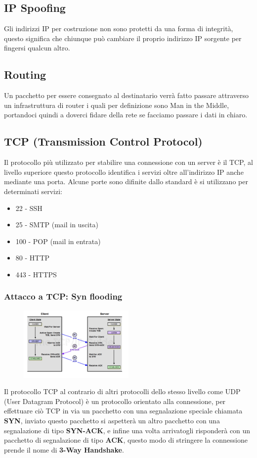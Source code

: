 \subsection{IP Spoofing}
Gli indirizzi IP per costruzione non sono protetti da una forma di integrità, questo significa che chiunque può cambiare il proprio indirizzo IP sorgente per fingersi qualcun altro.
\subsection{Routing}
Un pacchetto per essere consegnato al destinatario verrà fatto passare attraverso un infrastruttura di router i quali per definizione sono Man in the Middle, portandoci quindi a doverci fidare della rete se facciamo passare i dati in chiaro.
\subsection{TCP (Transmission Control Protocol)}
Il protocollo più utilizzato per stabilire una connessione con un server è il TCP, al livello superiore questo protocollo identifica i servizi oltre all'indirizzo IP anche mediante una porta. Alcune porte sono difinite dallo standard è si utilizzano per determinati servizi:
\begin{itemize}
    \item 22 - SSH
    \item 25 - SMTP (mail in uscita)
    \item 100 - POP (mail in entrata)
    \item 80 - HTTP
    \item 443 - HTTPS
\end{itemize}

\subsubsection{Attacco a TCP: Syn flooding}
\begin{figure}
    \begin{center}
        \includegraphics[width=0.5\textwidth]{res/3way-handshake.png}
    \end{center}
\end{figure}
Il protocollo TCP al contrario di altri protocolli dello stesso livello come UDP (User Datagram Protocol) è un protocollo orientato alla connessione, per effettuare ciò TCP in via un pacchetto con una segnalazione speciale chiamata \textbf{SYN}, inviato questo pacchetto si aspetterà un altro pacchetto con una segnalazione di tipo \textbf{SYN-ACK}, e infine una volta arrivatogli risponderà con un pacchetto di segnalazione di tipo \textbf{ACK}, questo modo di stringere la connessione prende il nome di \textbf{3-Way Handshake}.

